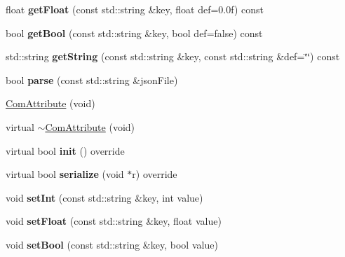 \begin{DoxyCompactItemize}
float {\bfseries get\+Float} (const std\+::string \&key, float def=0.\+0f) const
\item 
\mbox{\label{classcocostudio_1_1ComAttribute_a6cc9cb29eb2471f4bf6db7876475f333}} 
bool {\bfseries get\+Bool} (const std\+::string \&key, bool def=false) const
\item 
\mbox{\label{classcocostudio_1_1ComAttribute_ac7c94828336181401bd65034d98b9314}} 
std\+::string {\bfseries get\+String} (const std\+::string \&key, const std\+::string \&def=\char`\"{}\char`\"{}) const
\item 
\mbox{\label{classcocostudio_1_1ComAttribute_a744870ce9078053ca58c940ad2836ad5}} 
bool {\bfseries parse} (const std\+::string \&json\+File)
\item 
\hyperlink{classcocostudio_1_1ComAttribute_adb9f109392486c4c6484ba806f47207f}{Com\+Attribute} (void)
\item 
virtual \hyperlink{classcocostudio_1_1ComAttribute_a861e3cd9bffe1e828f427ca1f167fdfd}{$\sim$\+Com\+Attribute} (void)
\item 
\mbox{\label{classcocostudio_1_1ComAttribute_a5dd6c18e7ed930ca7256ce8d48d8d954}} 
virtual bool {\bfseries init} () override
\item 
\mbox{\label{classcocostudio_1_1ComAttribute_afb9615933352c308b6175df28e617bc0}} 
virtual bool {\bfseries serialize} (void $\ast$r) override
\item 
\mbox{\label{classcocostudio_1_1ComAttribute_a90fe680a304fc2aa1a239dca6f00c9f7}} 
void {\bfseries set\+Int} (const std\+::string \&key, int value)
\item 
\mbox{\label{classcocostudio_1_1ComAttribute_a0ff638ca919a0f70090071c25fb79934}} 
void {\bfseries set\+Float} (const std\+::string \&key, float value)
\item 
\mbox{\label{classcocostudio_1_1ComAttribute_ac4a475fb5add1234f3d130b1e68dd200}} 
void {\bfseries set\+Bool} (const std\+::string \&key, bool value)

\end{DoxyCompactItemize}
